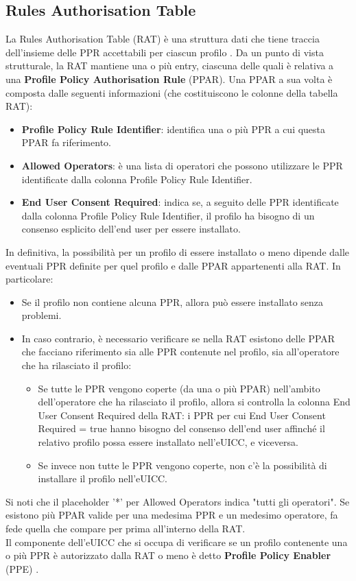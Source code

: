 \documentclass[10pt, oneside]{book}
\begin{document}
\subsection{Rules Authorisation Table}\label{sec:rat}
La Rules Authorisation Table (RAT) è una struttura dati che tiene traccia dell'insieme delle PPR accettabili per ciascun profilo \cite{GSMA-docs-new}. Da un punto di vista strutturale, la RAT mantiene una o più entry, ciascuna delle quali è relativa a una \textbf{Profile Policy Authorisation Rule} (PPAR). Una PPAR a sua volta è composta dalle seguenti informazioni (che costituiscono le colonne della tabella RAT):
\begin{itemize}
\item \textbf{Profile Policy Rule Identifier}: identifica una o più PPR a cui questa PPAR fa riferimento.
\item \textbf{Allowed Operators}: è una lista di operatori che possono utilizzare le PPR identificate dalla colonna Profile Policy Rule Identifier.
\item \textbf{End User Consent Required}: indica se, a seguito delle PPR identificate dalla colonna Profile Policy Rule Identifier, il profilo ha bisogno di un consenso esplicito dell'end user per essere installato.
\end{itemize}
In definitiva, la possibilità per un profilo di essere installato o meno dipende dalle eventuali PPR definite per quel profilo e dalle PPAR appartenenti alla RAT. In particolare:
\begin{itemize}
\item Se il profilo non contiene alcuna PPR, allora può essere installato senza problemi.
\item In caso contrario, è necessario verificare se nella RAT esistono delle PPAR che facciano riferimento sia alle PPR contenute nel profilo, sia all'operatore che ha rilasciato il profilo:
\begin{itemize}[itemsep=0pt]
\item Se tutte le PPR vengono coperte (da una o più PPAR) nell'ambito dell'operatore che ha rilasciato il profilo, allora si controlla la colonna End User Consent Required della RAT: i PPR per cui End User Consent Required = true hanno bisogno del consenso dell'end user affinché il relativo profilo possa essere installato nell'eUICC, e viceversa.
\item Se invece non tutte le PPR vengono coperte, non c'è la possibilità di installare il profilo nell'eUICC.
\end{itemize}
\end{itemize}
Si noti che il placeholder '*' per Allowed Operators indica "tutti gli operatori". Se esistono più PPAR valide per una medesima PPR e un medesimo operatore, fa fede quella che compare per prima all'interno della RAT.\\
Il componente dell'eUICC che si occupa di verificare se un profilo contenente una o più PPR è autorizzato dalla RAT o meno è detto \textbf{Profile Policy Enabler} (PPE) \cite{GSMA-docs-new}.
\end{document}
